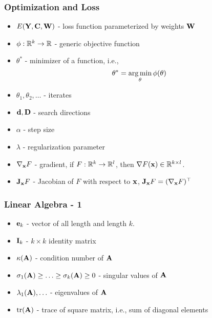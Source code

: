 \documentclass[12pt,fleqn]{beamer}
\begin{document}
\begin{frame}
	\frametitle{Optimization and Loss}
	
	\begin{itemize}
		\item $E({\bf Y},{\bf C},{\bf W})$ - loss function parameterized by weights ${\bf W}$
		\item $\phi : \mathbb{R}^{k} \to \mathbb{R}$ - generic objective function
		\item $\theta^*$ - minimizer of a function, i.e.,
		$$
			\theta^* = \operatorname*{arg\,min}_{\theta} \phi(\theta)
		$$
		\item $\theta_1,\theta_2, \ldots$ - iterates
		\item ${\bf d}, {\bf D}$ - search directions
		\item $\alpha$ - step size
		\item $\lambda$ - regularization parameter
		\item $\nabla_{\bf x} F$ - gradient, if $ F : \mathbb{R}^k \to \mathbb{R}^l $, then $\nabla F({\bf x}) \in \mathbb{R}^{k\times l}$.
		\item ${\bf J}_{\bf x} F$ - Jacobian of $F$ with respect to ${\bf x}$, ${\bf J}_{{\bf x}} F = (\nabla_{\bf x} F)^\top$
	\end{itemize}
\end{frame}

\begin{frame}
	\frametitle{Linear Algebra - 1}
	\begin{itemize}
		\item ${\bf e}_k$ - vector of all length and length $k$.
		\item ${\bf I}_k$ - $k\times k$ identity matrix
		\item $\kappa({\bf A})$ - condition number of ${\bf A}$
		\item $\sigma_1({\bf A})\geq\ldots\geq\sigma_k({\bf A})\geq 0$ - singular values of ${\bf A}$
		\item $\lambda_1({\bf A}),\ldots$ - eigenvalues of ${\bf A}$
		\item ${\rm tr}({\bf A})$ - trace of square matrix, i.e., sum of diagonal elements
	\end{itemize}
\end{frame}
\end{document}
